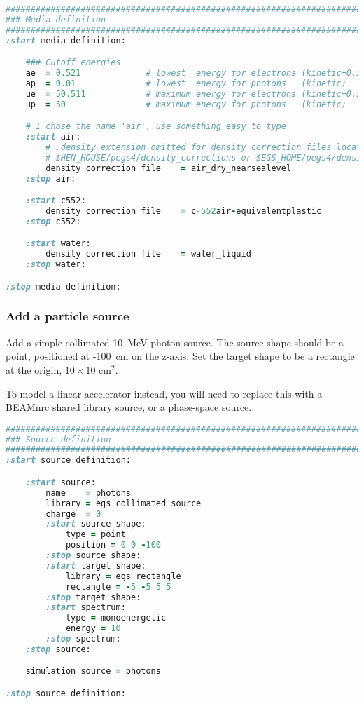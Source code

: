 \documentclass[12pt,twoside]{article}
\begin{document}
{\small
\begin{lstlisting}[language=ruby,backgroundcolor=\color{white}]
##############################################################################
### Media definition
##############################################################################
:start media definition:

    ### Cutoff energies
    ae  = 0.521             # lowest  energy for electrons (kinetic+0.511)
    ap  = 0.01              # lowest  energy for photons   (kinetic)
    ue  = 50.511            # maximum energy for electrons (kinetic+0.511)
    up  = 50                # maximum energy for photons   (kinetic)

    # I chose the name 'air', use something easy to type
    :start air:
        # .density extension omitted for density correction files located in
        # $HEN_HOUSE/pegs4/density_corrections or $EGS_HOME/pegs4/density_corrections
        density correction file    = air_dry_nearsealevel
    :stop air:

    :start c552:
        density correction file    = c-552air-equivalentplastic
    :stop c552:

    :start water:
        density correction file    = water_liquid
    :stop water:

:stop media definition:
\end{lstlisting}
}

\subsubsection{Add a particle source}
Add a simple collimated 10~MeV photon source. The source shape should be a point,
positioned at -100~cm on the z-axis. Set the target shape to be a rectangle
at the origin, $10\times10$ cm$^2$.

To model a linear accelerator instead,
you will need to replace this with a \href{http://nrc-cnrc.github.io/EGSnrc/doc/pirs898/classEGS__BeamSource.html}{BEAMnrc shared library source}, or a \href{http://nrc-cnrc.github.io/EGSnrc/doc/pirs898/classEGS__PhspSource.html}{phase-space source}.

{\small
\begin{lstlisting}[language=ruby,backgroundcolor=\color{white}]
##############################################################################
### Source definition
##############################################################################
:start source definition:

    :start source:
        name    = photons
        library = egs_collimated_source
        charge  = 0
        :start source shape:
            type = point
            position = 0 0 -100
        :stop source shape:
        :start target shape:
            library = egs_rectangle
            rectangle = -5 -5 5 5
        :stop target shape:
        :start spectrum:
            type = monoenergetic
            energy = 10
        :stop spectrum:
    :stop source:

    simulation source = photons

:stop source definition:
\end{lstlisting}
}
\end{document}
